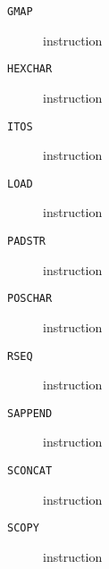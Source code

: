 \clearpage
\begin{description}
\item[\texttt{GMAP}] instruction\\

\end{description}
\clearpage
\begin{description}
\item[\texttt{HEXCHAR}] instruction\\

\end{description}
\clearpage
\begin{description}
\item[\texttt{ITOS}] instruction\\

\end{description}
\clearpage
\begin{description}
\item[\texttt{LOAD}] instruction\\

\end{description}
\clearpage
\begin{description}
\item[\texttt{PADSTR}] instruction\\

\end{description}
\clearpage
\begin{description}
\item[\texttt{POSCHAR}] instruction\\

\end{description}
\clearpage
\begin{description}
\item[\texttt{RSEQ}] instruction\\

\end{description}
\clearpage
\begin{description}
\item[\texttt{SAPPEND}] instruction\\

\end{description}
\clearpage
\begin{description}
\item[\texttt{SCONCAT}] instruction\\

\end{description}
\clearpage
\begin{description}
\item[\texttt{SCOPY}] instruction\\

\end{description}

